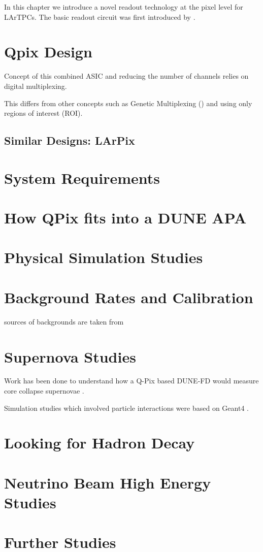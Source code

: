 In this chapter we introduce a novel readout technology at the pixel level for LArTPCs. 
The basic readout circuit was first introduced by \citep{qpix:nygren:mei}.

\section{Qpix Design}

Concept of this combined ASIC and reducing the number of channels relies on digital multiplexing.

This differs from other concepts such as Genetic Multiplexing (\citep{PROCUREUR2013888_genetic_multiplexing}) and using only regions of interest (ROI).

\subsection{Similar Designs: LArPix}

\section{System Requirements}

\section{How QPix fits into a DUNE APA}

\section{Physical Simulation Studies}

\section{Background Rates and Calibration}

sources of backgrounds are taken from \citep{DUNE-FD:Abi_2020}

\section{Supernova Studies}

Work has been done to understand how a Q-Pix based DUNE-FD would measure core collapse supernovae \citep{qpix:shion}.

Simulation studies which involved particle interactions were based on Geant4 \citep{geant4:AGOSTINELLI2003250}.


\section{Looking for Hadron Decay}

\section{Neutrino Beam High Energy Studies}

\section{Further Studies}